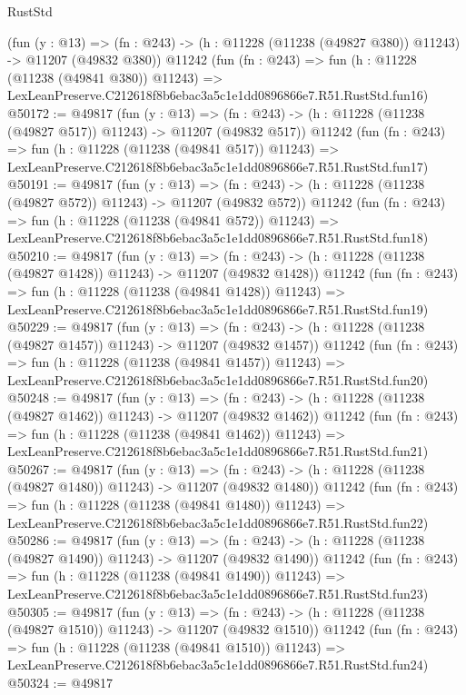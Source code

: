 \begin{lexlean}{RustStd}
\begin{coremodule}
    (fun (y : @13) =>
    (fn : @243) -> (h : @11228 (@11238 (@49827 @380)) @11243) -> @11207 (@49832 @380))
    @11242
    (fun (fn : @243) =>
    fun (h : @11228 (@11238 (@49841 @380)) @11243) =>
    LexLeanPreserve.C212618f8b6ebac3a5c1e1dd0896866e7.R51.RustStd.fun16)
@50172 := @49817
    (fun (y : @13) =>
    (fn : @243) -> (h : @11228 (@11238 (@49827 @517)) @11243) -> @11207 (@49832 @517))
    @11242
    (fun (fn : @243) =>
    fun (h : @11228 (@11238 (@49841 @517)) @11243) =>
    LexLeanPreserve.C212618f8b6ebac3a5c1e1dd0896866e7.R51.RustStd.fun17)
@50191 := @49817
    (fun (y : @13) =>
    (fn : @243) -> (h : @11228 (@11238 (@49827 @572)) @11243) -> @11207 (@49832 @572))
    @11242
    (fun (fn : @243) =>
    fun (h : @11228 (@11238 (@49841 @572)) @11243) =>
    LexLeanPreserve.C212618f8b6ebac3a5c1e1dd0896866e7.R51.RustStd.fun18)
@50210 := @49817
    (fun (y : @13) =>
    (fn : @243) -> (h : @11228 (@11238 (@49827 @1428)) @11243) -> @11207 (@49832 @1428))
    @11242
    (fun (fn : @243) =>
    fun (h : @11228 (@11238 (@49841 @1428)) @11243) =>
    LexLeanPreserve.C212618f8b6ebac3a5c1e1dd0896866e7.R51.RustStd.fun19)
@50229 := @49817
    (fun (y : @13) =>
    (fn : @243) -> (h : @11228 (@11238 (@49827 @1457)) @11243) -> @11207 (@49832 @1457))
    @11242
    (fun (fn : @243) =>
    fun (h : @11228 (@11238 (@49841 @1457)) @11243) =>
    LexLeanPreserve.C212618f8b6ebac3a5c1e1dd0896866e7.R51.RustStd.fun20)
@50248 := @49817
    (fun (y : @13) =>
    (fn : @243) -> (h : @11228 (@11238 (@49827 @1462)) @11243) -> @11207 (@49832 @1462))
    @11242
    (fun (fn : @243) =>
    fun (h : @11228 (@11238 (@49841 @1462)) @11243) =>
    LexLeanPreserve.C212618f8b6ebac3a5c1e1dd0896866e7.R51.RustStd.fun21)
@50267 := @49817
    (fun (y : @13) =>
    (fn : @243) -> (h : @11228 (@11238 (@49827 @1480)) @11243) -> @11207 (@49832 @1480))
    @11242
    (fun (fn : @243) =>
    fun (h : @11228 (@11238 (@49841 @1480)) @11243) =>
    LexLeanPreserve.C212618f8b6ebac3a5c1e1dd0896866e7.R51.RustStd.fun22)
@50286 := @49817
    (fun (y : @13) =>
    (fn : @243) -> (h : @11228 (@11238 (@49827 @1490)) @11243) -> @11207 (@49832 @1490))
    @11242
    (fun (fn : @243) =>
    fun (h : @11228 (@11238 (@49841 @1490)) @11243) =>
    LexLeanPreserve.C212618f8b6ebac3a5c1e1dd0896866e7.R51.RustStd.fun23)
@50305 := @49817
    (fun (y : @13) =>
    (fn : @243) -> (h : @11228 (@11238 (@49827 @1510)) @11243) -> @11207 (@49832 @1510))
    @11242
    (fun (fn : @243) =>
    fun (h : @11228 (@11238 (@49841 @1510)) @11243) =>
    LexLeanPreserve.C212618f8b6ebac3a5c1e1dd0896866e7.R51.RustStd.fun24)
@50324 := @49817

\end{coremodule}
\end{lexlean}
